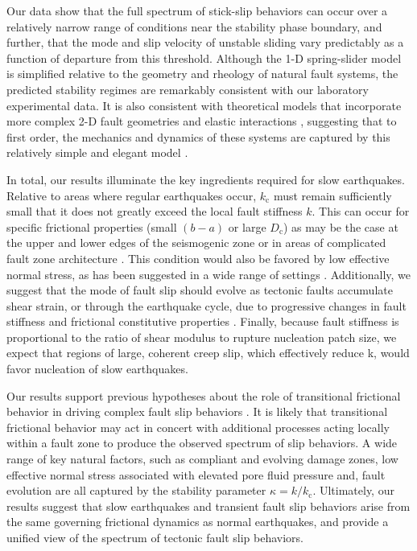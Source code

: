 Our data show that the full spectrum of stick-slip behaviors can occur over a relatively narrow range of conditions near the stability phase boundary, and further, that the mode and slip velocity of unstable sliding vary predictably as a function of departure from this threshold. Although the 1-D spring-slider model is simplified relative to the geometry and rheology of natural fault systems, the predicted stability regimes are remarkably consistent with our laboratory experimental data. It is also consistent with theoretical models that incorporate more complex 2-D fault geometries and elastic interactions \cite{liu2007spontaneous}, suggesting that to first order, the mechanics and dynamics of these systems are captured by this relatively simple and elegant model \cite{kaproth2013slow,scholz1972detailed,gu1984slip,marone1998laboratory,kodaira2004high}. 

In total, our results illuminate the key ingredients required for slow earthquakes. Relative to areas where regular earthquakes occur, $k_\text{c}$ must remain sufficiently small that it does not greatly exceed the local fault stiffness $k$. This can occur for specific frictional properties  (small $(b-a)$ or large $D_\text{c}$) as may be the case at the upper and lower edges of the seismogenic zone or in areas of complicated fault zone architecture \cite{liu2007spontaneous}. This condition would also be favored by low effective normal stress, as has been suggested in a wide range of settings \cite{houston2015low,hawthorne2010tidal,kodaira2004high,bilek1999rigidity,kitajima2012elevated,winberry2014tidal}. Additionally, we suggest that the mode of fault slip should evolve as tectonic faults accumulate shear strain, or through the earthquake cycle, due to progressive changes in fault stiffness and frictional constitutive properties \cite{bilek1999rigidity, winberry2014tidal}. Finally, because fault stiffness is proportional to the ratio of shear modulus to rupture nucleation patch size, we expect that regions of large, coherent creep slip, which effectively reduce k, would favor nucleation of slow earthquakes.  

Our results support previous hypotheses about the role of transitional frictional behavior in driving complex fault slip behaviors \cite{liu2007spontaneous,gu1984slip,kodaira2004high,bilek1999rigidity,kitajima2012elevated}. It is likely that transitional frictional behavior may act in concert with additional processes acting locally within a fault zone to produce the observed spectrum of slip behaviors. A wide range of key natural factors, such as compliant and evolving damage zones, low effective normal stress associated with elevated pore fluid pressure and, fault evolution are all captured by the stability parameter $\kappa=k/k_\text{c}$. Ultimately, our results suggest that slow earthquakes and transient fault slip behaviors arise from the same governing frictional dynamics as normal earthquakes, and provide a unified view of the spectrum of tectonic fault slip behaviors. 

